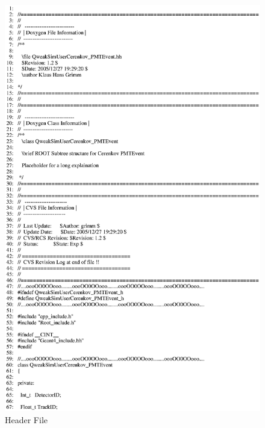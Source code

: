 \begin{figure}[ht]
  \hspace{0cm}
  \includegraphics[scale=0.8]{./figures5/QweakSimUserCerenkov_PMTEvent.hh-p1.eps}
  \caption{\label{SourceV40} Header File}
           \label{fig:V-SC-43}
\end{figure}

\clearpage

